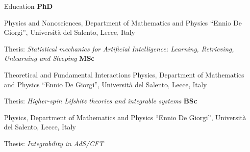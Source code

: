 \begin{rubric}{Education}
  \textbf{PhD}\par Physics and Nanosciences, Department of Mathematics and Physics ``Ennio De Giorgi'', Università del Salento, Lecce, Italy\par Thesis: \emph{Statistical mechanics for Artificial Intelligence: Learning, Retrieving, Unlearning and Sleeping}
  \textbf{MSc}\par Theoretical and Fundamental Interactions Physics, Department of Mathematics and Physics ``Ennio De Giorgi'', Università del Salento, Lecce, Italy\par Thesis: \emph{Higher-spin Lifshitz theories and integrable systems}
  \textbf{BSc}\par Physics, Department of Mathematics and Physics ``Ennio De Giorgi'', Università del Salento, Lecce, Italy\par Thesis: \emph{Integrability in AdS/CFT}
\end{rubric}
